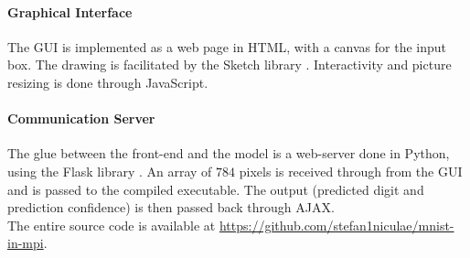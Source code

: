 \documentclass[a4paper]{article}
\begin{document}
\paragraph{Graphical Interface} The GUI is implemented as a web page in HTML, with a canvas for the input box.
The drawing is facilitated by the Sketch library \cite{sketch}. Interactivity and picture resizing is done through JavaScript.

\paragraph{Communication Server} The glue between the front-end and the model is a web-server done in Python, using the Flask library \cite{flask}. An array of $784$ pixels is received through from the GUI and is passed to the compiled executable. The output (predicted digit and prediction confidence) is then passed back through AJAX.
\\

The entire source code is available at \url{https://github.com/stefan1niculae/mnist-in-mpi}.

\vspace{\fill} %

    
    
\end{document}
